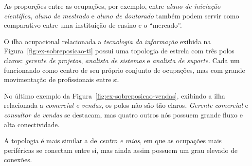 \documentclass[
  article,
  11pt,
  a4paper,
  english,
  brazil,
  sumario=tradicional]{abntex2}
\begin{document}
As proporções entre as ocupações, por exemplo, entre \textit{aluno de iniciação científica}, \textit{aluno de mestrado} e \textit{aluno de doutorado} também podem servir como comparativo entre uma instituição de ensino e o \enquote{mercado}.

O ilha ocupacional relacionada a \textit{tecnologia da informação} exibida na Figura~\ref{fig:ex-sobreposicao-ti} possui uma topologia de estrela com três polos claros: \textit{gerente de projetos}, \textit{analista de sistemas} e \textit{analista de suporte}. Cada um funcionando como centro de seu próprio conjunto de ocupações, mas com grande movimentação de profissionais entre si.

No último exemplo da Figura~\ref{fig:ex-sobreposicao-vendas}, exibindo a ilha relacionada a \textit{comercial e vendas}, os polos não são tão claros. \textit{Gerente comercial} e \textit{consultor de vendas} se destacam, mas quatro outros nós possuem grande fluxo e alta conectividade.

A topologia é mais similar a de \textit{centro e raios}, em que as ocupações mais periféricas se conectam entre si, mas ainda assim possuem um grau elevado de conexões.
\end{document}
